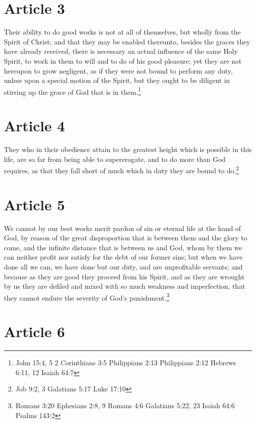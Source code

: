 \documentclass[12pt,letterpaper]{book}
\begin{document}
\section{Article 3}

Their ability to do good works is not at all of themselves, but wholly from the Spirit of Christ; and that they may be enabled thereunto, besides the graces they have already received, there is necessary an actual influence of the same Holy Spirit, to work in them to will and to do of his good pleasure; yet they are not hereupon to grow negligent, as if they were not bound to perform any duty, unless upon a special motion of the Spirit, but they ought to be diligent in stirring up the grace of God that is in them.\footnote{John 15:4, 5 2 Corinthians 3:5 Philippians 2:13 Philippians 2:12 Hebrews 6:11, 12 Isaiah 64:7}

\section{Article 4}

They who in their obedience attain to the greatest height which is possible in this life, are so far from being able to supererogate, and to do more than God requires, as that they fall short of much which in duty they are bound to do.\footnote{Job 9:2, 3 Galatians 5:17 Luke 17:10}

\section{Article 5}

We cannot by our best works merit pardon of sin or eternal life at the hand of God, by reason of the great disproportion that is between them and the glory to come, and the infinite distance that is between us and God, whom by them we can neither profit nor satisfy for the debt of our former sins; but when we have done all we can, we have done but our duty, and are unprofitable servants; and because as they are good they proceed from his Spirit, and as they are wrought by us they are defiled and mixed with so much weakness and imperfection, that they cannot endure the severity of God's punishment.\footnote{Romans 3:20 Ephesians 2:8, 9 Romans 4:6 Galatians 5:22, 23 Isaiah 64:6 Psalms 143:2}

\section{Article 6}
\end{document}
